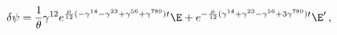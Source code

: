 \begin{equation}
\delta\psi=\frac{1}{\theta}\gamma^{12}e^{\frac{\mu}{12}(-\gamma^{14}-\gamma^{23}+\gamma^{56}+\gamma^{789})t}\E
+e^{-\frac{\mu}{12}(\gamma^{14}+\gamma^{23}-\gamma^{56}+3\gamma^{789})t}\E^{\prime}\,,
\end{equation}

